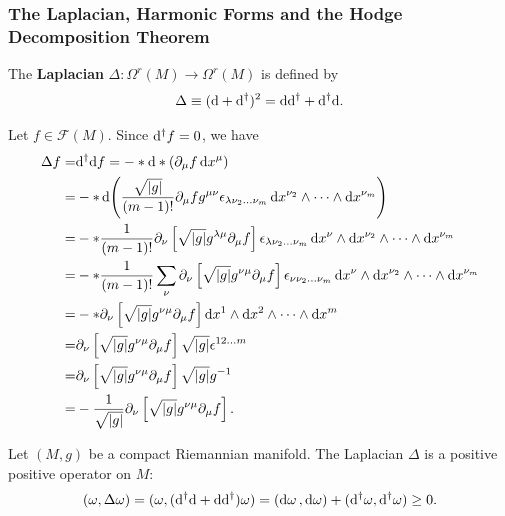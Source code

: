 \documentclass[10pt]{article}
\begin{document}
\subsubsection{The Laplacian, Harmonic Forms and the Hodge Decomposition Theorem}
\begin{definition}[Laplacian]
    The \textbf{Laplacian} $\Delta:\Omega^r(M)\to\Omega^r(M)$ is defined by
    \begin{align}
        \Delta\equiv(\mathrm{d}+\mathrm{d}^\dagger)^2=\mathrm{d}\mathrm{d}^\dagger+\mathrm{d}^\dagger\mathrm{d}.
    \end{align}
\end{definition}
\begin{example}
    Let $f\in\mathcal{F}(M)$.
    Since $\mathrm{d}^\dagger f=0$, we have
    \begin{align}
        \Delta f= & \mathrm{d}^\dagger\mathrm{d} f=-\ast\mathrm{d}\ast\left(\partial_\mu f\dd{x^\mu}\right)\notag                                                                                                                       \\
        =         & -\ast\dd(\frac{\sqrt{\abs{g}}}{(m-1)!}\partial_\mu fg^{\mu\nu}\epsilon_{\lambda\nu_2\dots\nu_m}\dd{x^{\nu_2}}\wedge\dots\wedge\dd{x^{\nu_m}})\notag                                            \\
        =         & -\ast\frac{1}{(m-1)!}\partial_\nu\left[\sqrt{\abs{g}}g^{\lambda\mu}\partial_\mu f\right]\epsilon_{\lambda\nu_2\dots\nu_m}\dd{x^\nu}\wedge\dd{x^{\nu_2}}\wedge\dots\wedge\dd{x^{\nu_m}}\notag   \\
        =         & -\ast\frac{1}{(m-1)!}\sum_{\nu}\partial_\nu\left[\sqrt{\abs{g}}g^{\nu\mu}\partial_\mu f\right]\epsilon_{\nu\nu_2\dots\nu_m}\dd{x^\nu}\wedge\dd{x^{\nu_2}}\wedge\dots\wedge\dd{x^{\nu_m}}\notag \\
        =         & -\ast\partial_\nu\left[\sqrt{\abs{g}}g^{\nu\mu}\partial_\mu f\right]\dd{x^1}\wedge\dd{x^{2}}\wedge\dots\wedge\dd{x^{m}}\notag                                                                  \\
        =         & \partial_\nu\left[\sqrt{\abs{g}}g^{\nu\mu}\partial_\mu f\right]\sqrt{\abs{g}}\epsilon^{12\dots m}\notag                                                                                        \\
        =         & \partial_\nu\left[\sqrt{\abs{g}}g^{\nu\mu}\partial_\mu f\right]\sqrt{\abs{g}}g^{-1}\notag                                                                                                      \\
        =         & -\frac{1}{\sqrt{\abs{g}}}\partial_\nu\left[\sqrt{\abs{g}}g^{\nu\mu}\partial_\mu f\right].
    \end{align}
\end{example}
\begin{property}
    Let $(M,g)$ be a compact Riemannian manifold.
    The Laplacian $\Delta$ is a positive positive operator on $M$:
    \begin{align}
        (\omega,\Delta\omega)=(\omega,(\mathrm{d}^\dagger\mathrm{d}+\mathrm{d}\mathrm{d}^\dagger)\omega)=(\dd{\omega},\dd{\omega})+(\mathrm{d}^\dagger\omega,\mathrm{d}^\dagger\omega)\geq0.
    \end{align}
\end{property}
\end{document}
